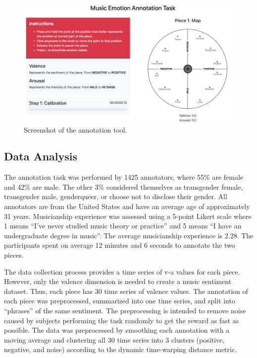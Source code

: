 \begin{figure}[!h]
 \centering
 \includegraphics[width=\columnwidth]{imgs/ismir19/annotation_tool.png}
 \caption{Screenshot of the annotation tool.}
 \label{fig:annotation_main}
\end{figure}

\subsection{Data Analysis}
\label{sec:data_analysys}

The annotation task was performed by 1425 annotators, where 55\% are female and 42\% are male. The other 3\% considered themselves as transgender female, transgender male, genderqueer, or choose not to disclose their gender. All annotators are from the United States and have an average age of approximately 31 years. Musicianship experience was assessed using a 5-point Likert scale where 1 means ``I've never studied music theory or practice'' and 5 means ``I have an undergraduate degree in music''. The average musicianship experience is 2.28. The participants spent on average 12 minutes and 6 seconds to annotate the two pieces.

The data collection process provides a time series of v-a values for each piece. However, only the valence dimension is needed to create a music sentiment dataset. Thus, each piece has 30 time series of valence values. The annotation of each piece was preprocessed, summarized into one time series, and split into ``phrases'' of the same sentiment. The preprocessing is intended to remove noise caused by subjects performing the task randomly to get the reward as fast as possible. The data was preprocessed by smoothing each annotation with a moving average and clustering all 30 time series into 3 clusters (positive, negative, and noise) according to the dynamic time-warping distance metric.

